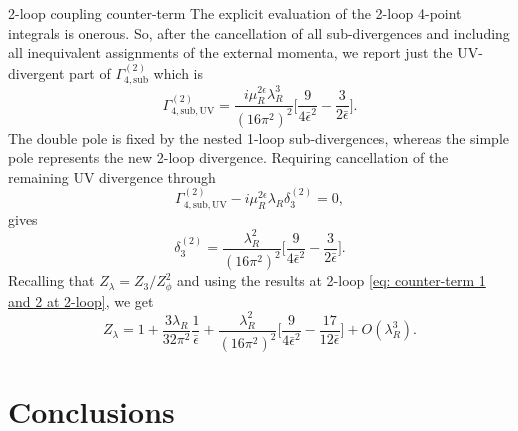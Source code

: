 \documentclass[aspectratio=169,10pt]{beamer}
\newcommand{\bepsilon}{\bar{\epsilon}}
\begin{document}
\begin{frame}{2-loop coupling counter-term}
\setlength{\belowdisplayskip}{2pt}
The explicit evaluation of the 2-loop 4-point integrals is onerous. 
So, after the cancellation of all sub-divergences and including all inequivalent assignments of the external momenta, we report just the UV-divergent part of $\Gamma_{4,\mathrm{sub}}^{(2)}$ which is
\begin{equation}
    \Gamma_{4,\mathrm{sub,UV}}^{(2)} = \frac{i\mu_R^{2\epsilon}\lambda_R^3}{(16\pi^2)^2}\bigg[\frac{9}{4\bepsilon^2} - \frac{3}{2\bepsilon}\bigg].
\end{equation}
The double pole is fixed by the nested 1-loop sub-divergences, whereas the simple pole represents the new 2-loop divergence. Requiring cancellation of the remaining UV divergence through
\begin{equation}
    \Gamma_{4,\mathrm{sub,UV}}^{(2)} - i\mu_R^{2\epsilon}\lambda_R\delta_3^{(2)} = 0,
\end{equation}
gives
\begin{equation}
    \delta_3^{(2)} = \frac{\lambda_R^2}{(16\pi^2)^2}\bigg[\frac{9}{4\bepsilon^2} - \frac{3}{2\bepsilon}\bigg].
\end{equation}
Recalling that $Z_\lambda = Z_3/Z_\phi^2$ and using the results at 2-loop \eqref{eq: counter-term 1 and 2 at 2-loop}, we get 
\begin{equation}
    Z_\lambda = 1 + \frac{3\lambda_R}{32\pi^2}\frac1{\bepsilon} + \frac{\lambda_R^2}{(16\pi^2)^2}\bigg[\frac{9}{4\bepsilon^2} - \frac{17}{12\bepsilon}\bigg] + O(\lambda_R^3).
\end{equation}
\end{frame}

\section{Conclusions}
\end{document}
